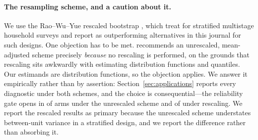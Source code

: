 \paragraph{The resampling scheme, and a caution about it.} We use the
Rao--Wu--Yue rescaled bootstrap \citep{rao1992recent}, which
\citet{bessonneau2021with} treat for stratified multistage household surveys and
\citet{scarpa2026inference} report as outperforming alternatives in this journal
for such designs. One objection has to be met. \citet{saigo2007mean} recommends
an unrescaled, mean-adjusted scheme precisely \emph{because} no rescaling is
performed, on the grounds that rescaling sits awkwardly with estimating
distribution functions and quantiles. Our estimands are distribution functions,
so the objection applies. We answer it empirically rather than by assertion:
Section~\ref{sec:applications} reports every diagnostic under both schemes, and
the choice is consequential---the reliability gate opens in \VerMofmOpen{} of
\VerMofmN{} arms under the unrescaled scheme and \VerRwyOpen{} of \VerRwyN{}
under rescaling. We report the rescaled results as primary because the
unrescaled scheme understates between-unit variance in a stratified design, and
we report the difference rather than absorbing it.
